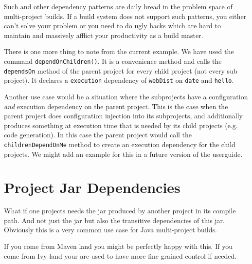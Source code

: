 Such and other dependency patterns are daily bread in the problem space of multi-project builds. If a build system does not support such patterns, you either can't solve your problem or you need to do ugly hacks which are hard to maintain and massively afflict your productivity as a build master.

There is one more thing to note from the current example. We have used the command \texttt{dependOnChildren()}. It is a convenience method and calls the \texttt{dependsOn} method of the parent project for every child project (not every sub project). It declares a \texttt{execution} dependency of \texttt{webDist} on \texttt{date} and \texttt{hello}.

Another use case would be a situation where the subprojects have a configuration \emph{and} execution dependency on the parent project. This is the case when the parent project does configuration injection into its subprojects, and additionally produces something at execution time that is needed by its child projects (e.g. code generation). In this case the parent project would call the \texttt{childrenDependOnMe} method to create an execution dependency for the child projects. We might add an example for this in a future version of the userguide.
\section{Project Jar Dependencies} %
\label{sec:project_jar_dependencies}
What if one projects needs the jar produced by another project in its compile path. And not just the jar but also the transitive dependencies of this jar. Obviously this is a very common use case for Java multi-project builds. 

If you come from Maven land you might be perfectly happy with this. If you come from Ivy land your are used to have more fine grained control if needed. 





